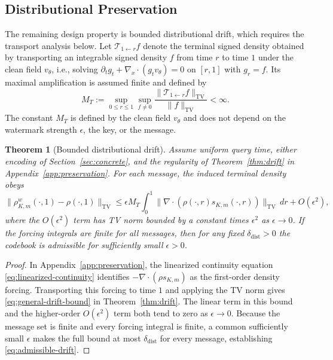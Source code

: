 \documentclass[11pt]{article}
\newtheorem{theorem}{Theorem}
\newcommand{\TV}{\mathrm{TV}}
\begin{document}
\subsection{Distributional Preservation}\label{sec:preservation}

The remaining design property is bounded distributional drift, which
requires the transport analysis below. Let
$\mathcal{T}_{1\leftarrow r}f$ denote the terminal signed density
obtained by transporting an integrable signed density $f$ from time
$r$ to time $1$ under the clean field $v_\theta$, i.e., solving
$\partial_t g_t+\nabla_x\!\cdot(g_t v_\theta)=0$ on $[r,1]$ with
$g_r=f$. Its maximal amplification is assumed finite and defined by
\begin{equation}\label{eq:transport-amplification}
M_T:=\sup_{0\le r\le1}\sup_{f\ne0}
\frac{\|\mathcal{T}_{1\leftarrow r}f\|_{\TV}}{\|f\|_{\TV}}<\infty.
\end{equation}
The constant $M_T$ is defined by the clean field $v_\theta$ and does
not depend on the watermark strength $\epsilon$, the key, or the
message.

\begin{theorem}[Bounded distributional drift]\label{thm:drift-main}
Assume uniform query time, either encoding of
Section~\ref{sec:concrete}, and the regularity of
Theorem~\ref{thm:drift} in Appendix~\ref{app:preservation}. For each
message, the induced terminal density obeys
\begin{equation}
\bigl\|\rho^w_{K,m}(\cdot,1)-\rho(\cdot,1)\bigr\|_{\TV}
\le\epsilon M_T\int_0^1
\bigl\|\nabla\!\cdot(\rho(\cdot,r)s_{K,m}(\cdot,r))\bigr\|_{\TV}\,dr
+O(\epsilon^2),
\end{equation}
where the $O(\epsilon^2)$ term has TV norm bounded by a constant times
$\epsilon^2$ as $\epsilon\to0$. If the forcing integrals are finite for
all messages, then for any fixed $\delta_{\mathrm{dist}}>0$ the
codebook is admissible for sufficiently small $\epsilon>0$.
\end{theorem}

\begin{proof}
In Appendix~\ref{app:preservation}, the linearized continuity equation
\eqref{eq:linearized-continuity} identifies
$-\nabla\!\cdot(\rho s_{K,m})$ as the first-order density forcing.
Transporting this forcing to time $1$ and applying the TV norm gives
\eqref{eq:general-drift-bound} in Theorem~\ref{thm:drift}.
The linear term in this bound and the higher-order $O(\epsilon^2)$ term
both tend to zero as $\epsilon\to0$. Because the message set is finite
and every forcing integral is finite, a common sufficiently small
$\epsilon$ makes the full bound at most $\delta_{\mathrm{dist}}$ for
every message, establishing \eqref{eq:admissible-drift}.
\end{proof}
\end{document}
